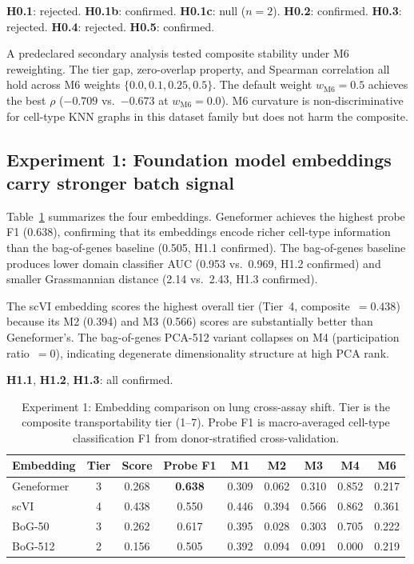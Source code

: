 \documentclass[11pt,letterpaper]{article}
\begin{document}
\textbf{H0.1}: rejected. \textbf{H0.1b}: confirmed. \textbf{H0.1c}: null ($n = 2$). \textbf{H0.2}: confirmed. \textbf{H0.3}: rejected. \textbf{H0.4}: rejected. \textbf{H0.5}: confirmed.

A predeclared secondary analysis tested composite stability under M6 reweighting. The tier gap, zero-overlap property, and Spearman correlation all hold across M6 weights $\{0.0, 0.1, 0.25, 0.5\}$. The default weight $w_{\mathrm{M6}} = 0.5$ achieves the best $\rho$ ($-0.709$ vs.\ $-0.673$ at $w_{\mathrm{M6}} = 0.0$). M6 curvature is non-discriminative for cell-type KNN graphs in this dataset family but does not harm the composite.

\subsection{Experiment 1: Foundation model embeddings carry stronger batch signal}

Table~\ref{tab:exp1} summarizes the four embeddings. Geneformer achieves the highest probe F1 (0.638), confirming that its embeddings encode richer cell-type information than the bag-of-genes baseline (0.505, H1.1 confirmed). The bag-of-genes baseline produces lower domain classifier AUC (0.953 vs.\ 0.969, H1.2 confirmed) and smaller Grassmannian distance (2.14 vs.\ 2.43, H1.3 confirmed).

The scVI embedding scores the highest overall tier (Tier~4, composite~$= 0.438$) because its M2 (0.394) and M3 (0.566) scores are substantially better than Geneformer's. The bag-of-genes PCA-512 variant collapses on M4 (participation ratio~$= 0$), indicating degenerate dimensionality structure at high PCA rank.

\textbf{H1.1}, \textbf{H1.2}, \textbf{H1.3}: all confirmed.

\begin{table}[t]
\centering
\caption{Experiment 1: Embedding comparison on lung cross-assay shift. Tier is the composite transportability tier (1--7). Probe F1 is macro-averaged cell-type classification F1 from donor-stratified cross-validation.}
\label{tab:exp1}
\small
\begin{tabular}{@{}lcccccccc@{}}
\toprule
Embedding & Tier & Score & Probe F1 & M1 & M2 & M3 & M4 & M6 \\
\midrule
Geneformer   & 3 & 0.268 & \textbf{0.638} & 0.309 & 0.062 & 0.310 & 0.852 & 0.217 \\
scVI         & 4 & 0.438 & 0.550 & 0.446 & 0.394 & 0.566 & 0.862 & 0.361 \\
BoG-50       & 3 & 0.262 & 0.617 & 0.395 & 0.028 & 0.303 & 0.705 & 0.222 \\
BoG-512      & 2 & 0.156 & 0.505 & 0.392 & 0.094 & 0.091 & 0.000 & 0.219 \\
\bottomrule
\end{tabular}
\end{table}
\end{document}
